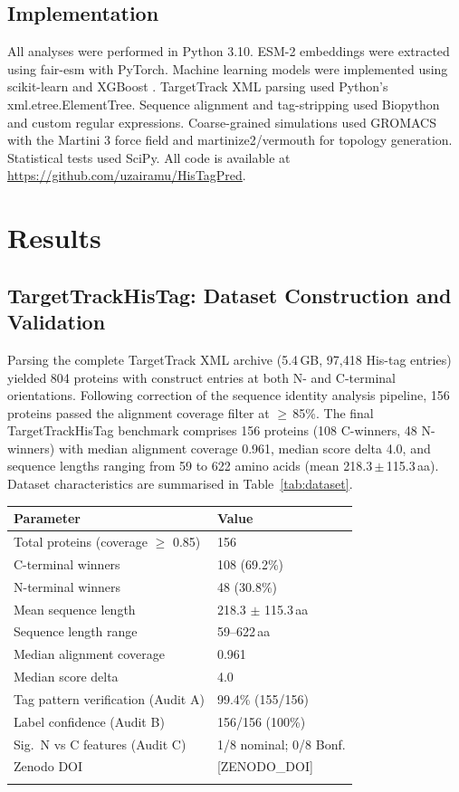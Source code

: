 \documentclass[unnumsec,webpdf,contemporary,large]{oup-authoring-template}
\begin{document}
\subsection{Implementation}
All analyses were performed in Python 3.10. ESM-2 embeddings were extracted using fair-esm with PyTorch. Machine learning models were implemented using scikit-learn \citep{pedregosa2011} and XGBoost \citep{chen2016}. TargetTrack XML parsing used Python's xml.etree.ElementTree. Sequence alignment and tag-stripping used Biopython \citep{cock2009} and custom regular expressions. Coarse-grained simulations used GROMACS \citep{berendsen1995} with the Martini 3 force field and martinize2/vermouth for topology generation. Statistical tests used SciPy. All code is available at \url{https://github.com/uzairamu/HisTagPred}.

\section{Results}

\subsection{TargetTrackHisTag: Dataset Construction and Validation}
Parsing the complete TargetTrack XML archive (5.4\,GB, 97,418 His-tag entries) yielded 804 proteins with construct entries at both N- and C-terminal orientations. Following correction of the sequence identity analysis pipeline, 156 proteins passed the alignment coverage filter at $\geq$\,85\%. The final TargetTrackHisTag benchmark comprises 156 proteins (108 C-winners, 48 N-winners) with median alignment coverage 0.961, median score delta 4.0, and sequence lengths ranging from 59 to 622 amino acids (mean 218.3\,$\pm$\,115.3\,aa). Dataset characteristics are summarised in Table~\ref{tab:dataset}.

\begin{table}[!t]
{\begin{tabular}{ll}
\toprule
Parameter & Value\\
\midrule
Total proteins (coverage $\geq$ 0.85) & 156\\
C-terminal winners & 108 (69.2\%)\\
N-terminal winners & 48 (30.8\%)\\
Mean sequence length & 218.3 $\pm$ 115.3\,aa\\
Sequence length range & 59--622\,aa\\
Median alignment coverage & 0.961\\
Median score delta & 4.0\\
Tag pattern verification (Audit A) & 99.4\% (155/156)\\
Label confidence (Audit B) & 156/156 (100\%)\\
Sig.\ N vs C features (Audit C) & 1/8 nominal; 0/8 Bonf.\\
Zenodo DOI & [ZENODO\_DOI]\\
\botrule
\end{tabular}}{}
\end{table}
\end{document}
